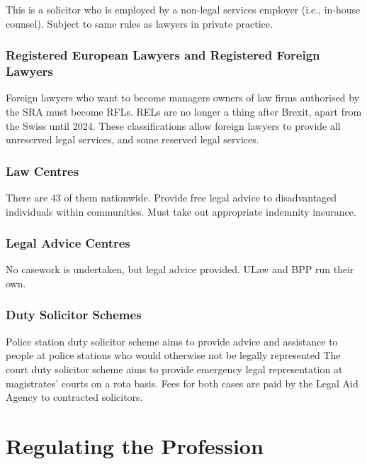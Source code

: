 \documentclass[
]{article}
\begin{document}
This is a solicitor who is employed by a non-legal services employer
(i.e., in-house counsel). Subject to same rules as lawyers in private
practice.

\hypertarget{registered-european-lawyers-and-registered-foreign-lawyers}{%
\subsubsection{Registered European Lawyers and Registered Foreign
Lawyers}\label{registered-european-lawyers-and-registered-foreign-lawyers}}

Foreign lawyers who want to become managers owners of law firms
authorised by the SRA must become RFLs. RELs are no longer a thing after
Brexit, apart from the Swiss until 2024. These classifications allow
foreign lawyers to provide all unreserved legal services, and some
reserved legal services.

\hypertarget{law-centres}{%
\subsubsection{Law Centres}\label{law-centres}}

There are 43 of them nationwide. Provide free legal advice to
disadvantaged individuals within communities. Must take out appropriate
indemnity insurance.

\hypertarget{legal-advice-centres}{%
\subsubsection{Legal Advice Centres}\label{legal-advice-centres}}

No casework is undertaken, but legal advice provided. ULaw and BPP run
their own.

\hypertarget{duty-solicitor-schemes}{%
\subsubsection{Duty Solicitor Schemes}\label{duty-solicitor-schemes}}

Police station duty solicitor scheme aims to provide advice and
assistance to people at police stations who would otherwise not be
legally represented The court duty solicitor scheme aims to provide
emergency legal representation at magistrates' courts on a rota basis.
Fees for both cases are paid by the Legal Aid Agency to contracted
solicitors.

\hypertarget{regulating-the-profession}{%
\section{Regulating the Profession}\label{regulating-the-profession}}
\end{document}
